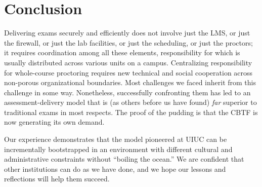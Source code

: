 \section{Conclusion}


Delivering exams securely and efficiently does not involve
just the LMS, or just the firewall, or just the lab facilities, or just the
scheduling, or just the proctors; it requires coordination among all
these elements, responsibility for which is usually distributed across
various units on a campus.
Centralizing responsibility for whole-course proctoring requires new
technical and social cooperation across non-porous organizational
boundaries.
Most challenges we faced inherit from this challenge in some
way.
Nonetheless, successfully confronting them has led to an
assessment-delivery model that is (as others before us have found)
\emph{far\/} superior to traditional exams in most respects.
The proof of the pudding is that the CBTF is now generating its own demand.

Our experience
demonstrates that the model pioneered at UIUC can be 
incrementally bootstrapped in an environment with different cultural
and administrative constraints without ``boiling the ocean.''  We are
confident that other institutions can do as we have done, and we
hope our lessons and reflections will help them succeed.
